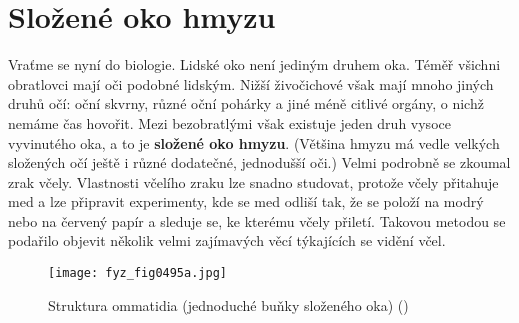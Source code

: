   \section{Složené oko hmyzu}\label{fyz:IchapXXXVIsecIV}
    Vraťme se nyní do biologie. Lidské oko není jediným druhem oka. Téměř všichni obratlovci mají
    oči podobné lidským. Nižší živočichové však mají mnoho jiných druhů očí: oční skvrny, různé oční
    pohárky a jiné méně citlivé orgány, o nichž nemáme čas hovořit. Mezi bezobratlými však existuje
    jeden druh vysoce vyvinutého oka, a to je \textbf{složené oko hmyzu}. (Většina hmyzu má vedle
    velkých složených očí ještě i různé dodatečné, jednodušší oči.) Velmi podrobně se zkoumal zrak
    včely. Vlastnosti včelího zraku lze snadno studovat, protože včely přitahuje med a lze připravit
    experimenty, kde se med odliší tak, že se položí na modrý nebo na červený papír a sleduje se, ke
    kterému včely přiletí. Takovou metodou se podařilo objevit několik velmi zajímavých věcí
    týkajících se vidění včel.

    \begin{figure*}[ht!] %
      \centering
      \texttt{[image: fyz\_fig0495a.jpg]}
      \caption{Struktura ommatidia (jednoduché buňky složeného oka) (\cite[s.~697]{Feynman01})}
      \label{fyz:fig0495}
    \end{figure*}

